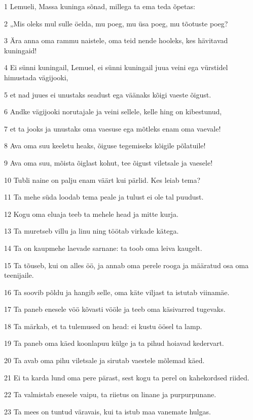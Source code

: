 \par 1 Lemueli, Massa kuninga sõnad, millega ta ema teda õpetas:
\par 2 „Mis oleks mul sulle öelda, mu poeg, mu üsa poeg, mu tõotuste poeg?
\par 3 Ära anna oma rammu naistele, oma teid nende hooleks, kes hävitavad kuningaid!
\par 4 Ei sünni kuningail, Lemuel, ei sünni kuningail juua veini ega vürstidel himustada vägijooki,
\par 5 et nad juues ei unustaks seadust ega väänaks kõigi vaeste õigust.
\par 6 Andke vägijooki norutajale ja veini sellele, kelle hing on kibestunud,
\par 7 et ta jooks ja unustaks oma vaesuse ega mõtleks enam oma vaevale!
\par 8 Ava oma suu keeletu heaks, õiguse tegemiseks kõigile põlatuile!
\par 9 Ava oma suu, mõista õiglast kohut, tee õigust viletsale ja vaesele!
\par 10 Tubli naine on palju enam väärt kui pärlid. Kes leiab tema?
\par 11 Ta mehe süda loodab tema peale ja tulust ei ole tal puudust.
\par 12 Kogu oma eluaja teeb ta mehele head ja mitte kurja.
\par 13 Ta muretseb villu ja linu ning töötab virkade kätega.
\par 14 Ta on kaupmehe laevade sarnane: ta toob oma leiva kaugelt.
\par 15 Ta tõuseb, kui on alles öö, ja annab oma perele rooga ja määratud osa oma teenijaile.
\par 16 Ta soovib põldu ja hangib selle, oma käte viljast ta istutab viinamäe.
\par 17 Ta paneb enesele vöö kõvasti vööle ja teeb oma käsivarred tugevaks.
\par 18 Ta märkab, et ta tulemused on head: ei kustu öösel ta lamp.
\par 19 Ta paneb oma käed koonlapuu külge ja ta pihud hoiavad kedervart.
\par 20 Ta avab oma pihu viletsale ja sirutab vaestele mõlemad käed.
\par 21 Ei ta karda lund oma pere pärast, sest kogu ta perel on kahekordsed riided.
\par 22 Ta valmistab enesele vaipu, ta riietus on linane ja purpurpunane.
\par 23 Ta mees on tuntud väravais, kui ta istub maa vanemate hulgas.
